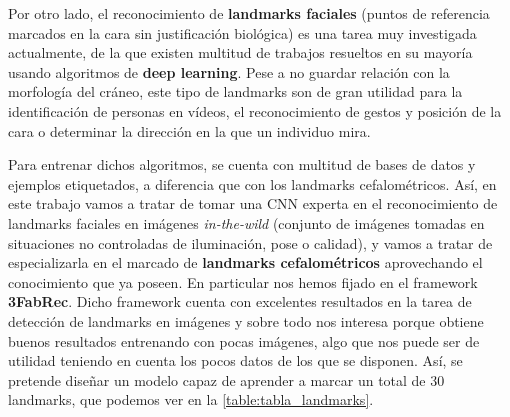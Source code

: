     \medskip 

    \noindent Por otro lado, el reconocimiento de \textbf{landmarks faciales} (puntos de referencia marcados en la cara sin justificación biológica) es una tarea muy investigada actualmente, de la que existen  multitud de trabajos resueltos en su mayoría usando algoritmos de \textbf{deep learning}. Pese a no guardar relación con la morfología del cráneo, este tipo de landmarks son de gran utilidad para la identificación de personas en vídeos, el reconocimiento de gestos y posición de la cara o determinar la dirección en la que un individuo mira. 

    \medskip

    \noindent Para entrenar dichos algoritmos, se cuenta con multitud de bases de datos y ejemplos etiquetados, a diferencia que con los landmarks cefalométricos. Así, en este trabajo vamos a tratar de tomar una CNN experta en el reconocimiento de landmarks faciales en imágenes \textit{in-the-wild} (conjunto de imágenes tomadas en situaciones no controladas de iluminación, pose o calidad), y vamos a tratar de especializarla en el marcado de \textbf{landmarks cefalométricos} aprovechando el conocimiento que ya poseen. En particular nos hemos fijado en el framework \textbf{3FabRec}\cite{browatzki20203fabrec}. Dicho framework cuenta con excelentes resultados en la tarea de detección de landmarks en imágenes y sobre todo nos interesa porque obtiene buenos resultados entrenando con pocas imágenes, algo que nos puede ser de utilidad teniendo en cuenta los pocos datos de los que se disponen. Así, se pretende diseñar un modelo capaz de aprender a marcar un total de $30$ landmarks, que podemos ver en la \autoref{table:tabla_landmarks}. 

